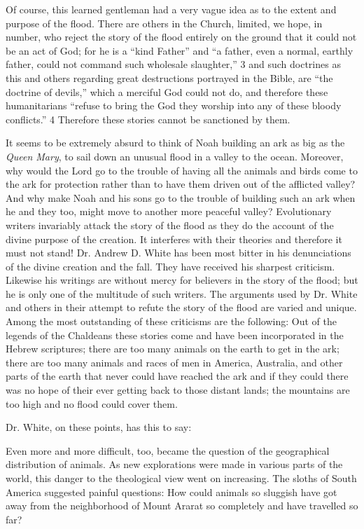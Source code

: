 Of course, this learned gentleman had a very vague idea as to the extent and purpose of the
flood. There are others in the Church, limited, we hope, in number, who reject the story of
the flood entirely on the ground that it could not be an act of God; for he is a ``kind Father''
and ``a father, even a normal, earthly father, could not command such wholesale slaughter,'' 3
and such doctrines as this and others regarding great destructions portrayed in the Bible, are
``the doctrine of devils,'' which a merciful God could not do, and therefore these
humanitarians ``refuse to bring the God they worship into any of these bloody conflicts.'' 4
Therefore these stories cannot be sanctioned by them.

It seems to be extremely absurd to think of Noah building an ark as big as the \textit{Queen Mary},
to sail down an unusual flood in a valley to the ocean. Moreover, why would the Lord go to
the trouble of having all the animals and birds come to the ark for protection rather than to
have them driven out of the afflicted valley? And why make Noah and his sons go to the
trouble of building such an ark when he and they too, might move to another more peaceful
valley? Evolutionary writers invariably attack the story of the flood as they do the account of
the divine purpose of the creation. It interferes with their theories and therefore it must not
stand! Dr. Andrew D. White has been most bitter in his denunciations of the divine creation
and the fall. They have received his sharpest criticism. Likewise his writings are without
mercy for believers in the story of the flood; but he is only one of the multitude of such
writers. The arguments used by Dr. White and others in their attempt to refute the story of the
flood are varied and unique. Among the most outstanding of these criticisms are the
following: Out of the legends of the Chaldeans these stories come and have been
incorporated in the Hebrew scriptures; there are too many animals on the earth to get in the
ark; there are too many animals and races of men in America, Australia, and other parts of
the earth that never could have reached the ark and if they could there was no hope of their
ever getting back to those distant lands; the mountains are too high and no flood could cover
them.

Dr. White, on these points, has this to say:

Even more and more difficult, too, became the question of the geographical distribution of
animals. As new explorations were made in various parts of the world, this danger to the
theological view went on increasing. The sloths of South America suggested painful
questions: How could animals so sluggish have got away from the neighborhood of Mount
Ararat so completely and have travelled so far?

